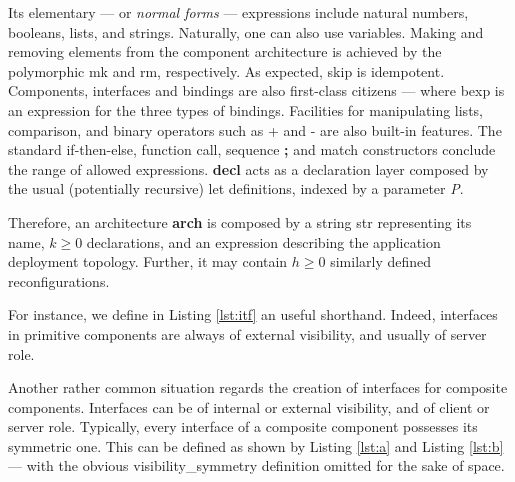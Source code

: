 		Its elementary --- or \textit{normal forms} --- expressions include natural numbers, 
	booleans, lists, and strings.	Naturally, one can also use variables. Making and removing
	elements from the component architecture is achieved by the polymorphic 
	\textsf{mk} and \textsf{rm}, respectively. As expected, \textsf{skip} is idempotent. 
	Components, interfaces and bindings are also first-class citizens --- where \textsf{bexp}
	is an expression for the three types of bindings. 
	 Facilities for manipulating lists, comparison, and
	binary operators such as \textsf{+} and \textsf{-} are also built-in features.
	The standard \textsf{if-then-else}, function call, sequence \textbf{;} and \textsf{match} 
	constructors	 conclude	the range of allowed expressions. \textbf{decl} acts as a
	declaration layer composed by the usual (potentially recursive) \textsf{let} definitions,
	indexed by a parameter \textit{P}.	
		
			
		Therefore, an architecture \textbf{arch} is composed by a string \textsf{str} representing its name,
		$k\geq 0$ declarations, and an expression describing the application deployment topology. Further, it may contain 
	$h \geq 0$ similarly defined reconfigurations.
				
		
		
	
	
	\noindent	 For instance, we define in Listing \ref{lst:itf}  an useful shorthand. Indeed, 
	interfaces in primitive components are always of \textsf{external} \textsf{visibility}, and
	usually of \textsf{server} \textsf{role}. 
	
	
	
	\noindent Another rather common situation regards the creation of interfaces for composite components. Interfaces can
	be of \textsf{internal} or \textsf{external} visibility, and of \textsf{client} or \textsf{server} role.	Typically, every interface
	of a composite component possesses its symmetric one. This can be defined as shown by Listing \ref{lst:a} and
	Listing \ref{lst:b} --- with the obvious 
	\textsf{visibility\_symmetry} definition omitted for the sake of space.	
	
